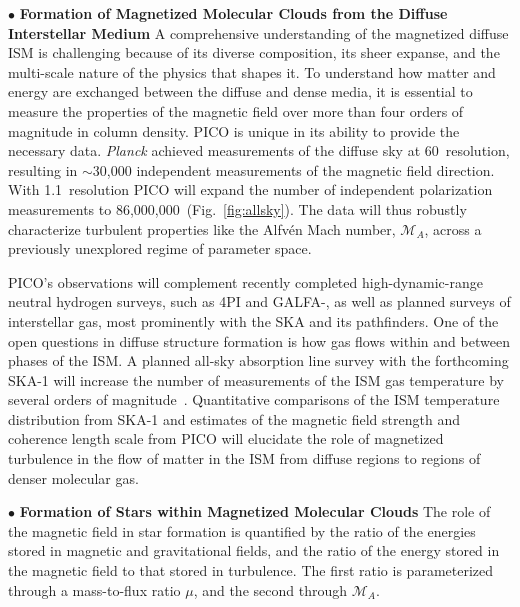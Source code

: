 \documentclass[PICOReport.tex]{subfiles}
\begin{document}
\noindent$\bullet$ {\bf Formation of Magnetized Molecular Clouds from the Diffuse Interstellar Medium} \hspace{0.1in}
A comprehensive understanding of the magnetized diffuse \ac{ISM} is challenging because of its diverse composition, its sheer expanse, and the multi-scale nature of the physics that shapes it. To understand how matter and energy are exchanged between the diffuse and dense media, it is essential to measure the properties of the magnetic field over more than four orders of magnitude in column density. PICO is unique in its ability to provide the necessary data. \textit{Planck} achieved measurements of the diffuse sky at 60\arcmin\ resolution, resulting in $\sim$30,000 independent measurements of the magnetic field direction.  With 1.1\arcmin~resolution PICO will expand the number of independent polarization measurements to 86,000,000~(Fig.~\ref{fig:allsky}). The data will thus robustly characterize turbulent properties like the Alfv\'{e}n Mach number, $\mathcal{M}_A$, across a previously unexplored regime of parameter space. 

PICO's observations will complement recently completed high-dynamic-range neutral hydrogen surveys, such as \HI4PI \citep{HI4PI:2016} and GALFA-\hi \citep{Peek:2018}, as well as planned surveys of interstellar gas, most prominently with the SKA and its pathfinders. One of the open questions in diffuse structure formation is how gas flows within and between phases of the \ac{ISM}. A planned all-sky absorption line survey with the forthcoming SKA-1 will increase the number of measurements of the \ac{ISM} gas temperature by several orders of magnitude~\citep{McClure-Griffiths2015}. Quantitative comparisons of the \ac{ISM} temperature distribution from SKA-1 and estimates of the magnetic field strength and coherence length scale from PICO will elucidate the role of magnetized turbulence in the flow of matter in the \ac{ISM} from diffuse regions to regions of denser molecular gas.

\noindent$\bullet$ {\bf Formation of Stars within Magnetized Molecular Clouds} \hspace{0.1in}
The role of the magnetic field in star formation is quantified by the ratio of the energies stored in magnetic and gravitational fields, and the ratio of the energy stored in the magnetic field to that stored in turbulence. The first ratio is parameterized through a mass-to-flux ratio $\mu$, and the second through $\mathcal{M}_A$. 
\end{document}

